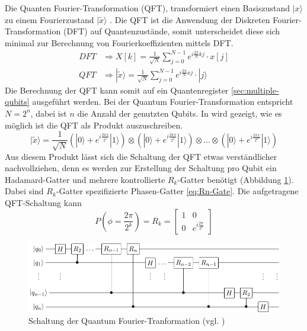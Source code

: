 Die Quanten Fourier-Transformation (QFT), transformiert einen Basiszustand $|x\rangle$ zu einem Fourierzustand $|\tilde{x}\rangle$ \cite{Qiskit-Textbook}. Die QFT ist die Anwendung der Diskreten Fourier-Transformation (DFT) auf Quantenzust\"ande, somit unterscheidet diese sich minimal zur Berechnung von Fourierkoeffizienten mittels DFT.
\begin{equation}
  \begin{aligned}
    DFT &\Rightarrow X[k] = \frac{1}{\sqrt{N}}\sum\limits_{j=0}^{N-1}e^{i\frac{2\pi}{N}kj}\cdot x[j] \\[1em]
    QFT &\Rightarrow |\tilde{x}\rangle = \frac{1}{\sqrt{N}}\sum\limits_{j=0}^{N-1}e^{i\frac{2\pi}{N}xj}\cdot|j\rangle
  \end{aligned}
\end{equation}
Die Berechnung der QFT kann somit auf ein Quantenregister \ref{sec:multiple-qubits} ausgef\"uhrt werden. Bei der Quantum Fourier-Transformation entspricht $N = 2^n$, dabei ist $n$ die Anzahl der genutzten Qubits. In \cite{Qiskit-Textbook} wird gezeigt, wie es m\"oglich ist die QFT als Produkt auszuschreiben.
\begin{equation}
  |\tilde{x}\rangle = \frac{1}{\sqrt{N}} \left(|0\rangle + e^{i\frac{2\pi x}{2^1}}|1\rangle\right)\otimes\left(|0\rangle + e^{i\frac{2\pi x}{2^2}}|1\rangle\right)\otimes\dots\otimes\left(|0\rangle + e^{i\frac{2\pi x}{2^n}}|1\rangle\right)
\end{equation}
Aus diesem Produkt l\"asst sich die Schaltung der QFT etwas verst\"andlicher nachvollziehen, denn es werden zur Erstellung der Schaltung pro Qubit ein Hadamard-Gatter und mehrere kontrollierte $R_k$-Gatter ben\"otigt (Abbildung \ref{fig:QFT-Circuit}). Dabei sind $R_k$-Gatter spezifizierte Phasen-Gatter \ref{eq:Rn-Gate}. Die aufgetragene QFT-Schaltung kann
\begin{equation}
\label{eq:Rn-Gate}
P\left(\phi = \frac{2\pi}{2^k}\right) = R_k = \begin{bmatrix}
    1 & 0 \\
    0 & e^{i\frac{2\pi}{2^k}}
    \end{bmatrix}
\end{equation}
\begin{figure}[h]
\centering
\includegraphics[width=1\textwidth]{figures/QFT.pdf}
\caption{Schaltung der Quantum Fourier-Tranformation (vgl. \cite{nielsen_chuang_2010})}
\label{fig:QFT-Circuit}
\end{figure}

